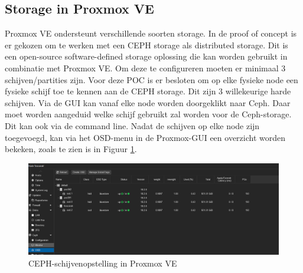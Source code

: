 \subsection{Storage in Proxmox VE}
\label{sec:storage_proxmox}
Proxmox VE ondersteunt verschillende soorten storage. In de proof of concept is er gekozen om te werken met een CEPH storage als distributed storage. Dit is een open-source software-defined storage oplossing die kan worden gebruikt in combinatie met Proxmox VE.
Om deze te configureren moeten er minimaal 3 schijven/partities zijn. Voor deze POC is er besloten om op elke fysieke node een fysieke schijf toe te kennen aan de CEPH storage. Dit zijn 3 willekeurige harde schijven.
Via de GUI kan vanaf elke node worden doorgeklikt naar Ceph. Daar moet worden aangeduid welke schijf gebruikt zal worden voor de Ceph-storage. Dit kan ook via de command line.
Nadat de schijven op elke node zijn toegevoegd, kan via het OSD-menu in de Proxmox-GUI een overzicht worden bekeken, zoals te zien is in Figuur \ref{fig:osd-ceph-proxmox}.
\begin{figure}[H]
  \centering
  \includegraphics[width=1.0\textwidth, trim=4cm 0cm 4cm 0cm, clip]{../poc/ceph-osd-prox.png}
  \caption{CEPH-schijvenopstelling in Proxmox VE}
  \label{fig:osd-ceph-proxmox}
\end{figure}

